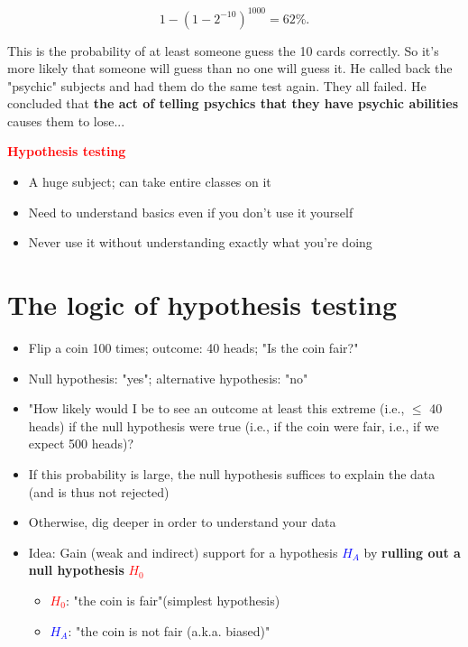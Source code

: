 \documentclass[11pt]{article}
\begin{document}
\[
	1 - (1 - 2^{-10})^{1000} = 62\%
.\] 

This is the probability of at least someone guess the 10 cards correctly. So it's more likely that someone will guess than no one will guess it. 
He called back the "psychic" subjects and had them do the same test again. They all failed. He concluded that \textbf{the act of telling psychics that they have psychic abilities} causes them to lose...

\textbf{\textcolor{red}{Hypothesis testing}}

\begin{itemize}
	\item A huge subject; can take entire classes on it
	\item Need to understand basics even if you don't use it yourself
	\item Never use it without understanding exactly what you're doing
\end{itemize}

\section*{The logic of hypothesis testing}
\begin{itemize}
	\item Flip a coin 100 times; outcome: 40 heads; "Is the coin fair?"
	\item Null hypothesis: "yes"; alternative hypothesis: "no"
	\item "How likely would I be to see an outcome at least this extreme (i.e., $\leq$ 40 heads) if the null hypothesis were true (i.e., if the coin were fair, i.e., if we expect 500 heads)?
	\item If this probability is large, the null hypothesis suffices to explain the data (and is thus not rejected)
	\item Otherwise, dig deeper in order to understand your data
\end{itemize}

\begin{itemize}
	\item Idea: Gain (weak and indirect) support for a hypothesis \textcolor{blue}{$H_A$} by \textbf{rulling out a null hypothesis} \textcolor{red}{$H_0$}
		\begin{itemize}
			\item \textcolor{red}{$H_0$}: "the coin is fair"(simplest hypothesis)
			\item \textcolor{blue}{$H_A$}: "the coin is not fair (a.k.a. biased)"
		\end{itemize}
\end{itemize}
\end{document}
